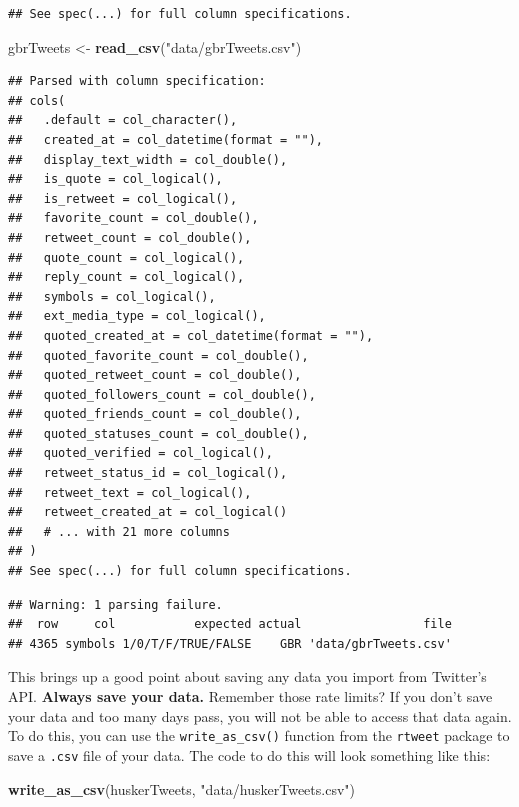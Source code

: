 \documentclass[]{book}
\newenvironment{Shaded}{\begin{snugshade}}{\end{snugshade}}
\newcommand{\KeywordTok}[1]{\textcolor[rgb]{0.13,0.29,0.53}{\textbf{#1}}}
\newcommand{\NormalTok}[1]{#1}
\newcommand{\StringTok}[1]{\textcolor[rgb]{0.31,0.60,0.02}{#1}}
\begin{document}
\begin{verbatim}
## See spec(...) for full column specifications.
\end{verbatim}

\begin{Shaded}
\begin{Highlighting}[]
\NormalTok{gbrTweets <-}\StringTok{ }\KeywordTok{read_csv}\NormalTok{(}\StringTok{"data/gbrTweets.csv"}\NormalTok{)}
\end{Highlighting}
\end{Shaded}

\begin{verbatim}
## Parsed with column specification:
## cols(
##   .default = col_character(),
##   created_at = col_datetime(format = ""),
##   display_text_width = col_double(),
##   is_quote = col_logical(),
##   is_retweet = col_logical(),
##   favorite_count = col_double(),
##   retweet_count = col_double(),
##   quote_count = col_logical(),
##   reply_count = col_logical(),
##   symbols = col_logical(),
##   ext_media_type = col_logical(),
##   quoted_created_at = col_datetime(format = ""),
##   quoted_favorite_count = col_double(),
##   quoted_retweet_count = col_double(),
##   quoted_followers_count = col_double(),
##   quoted_friends_count = col_double(),
##   quoted_statuses_count = col_double(),
##   quoted_verified = col_logical(),
##   retweet_status_id = col_logical(),
##   retweet_text = col_logical(),
##   retweet_created_at = col_logical()
##   # ... with 21 more columns
## )
## See spec(...) for full column specifications.
\end{verbatim}

\begin{verbatim}
## Warning: 1 parsing failure.
##  row     col           expected actual                 file
## 4365 symbols 1/0/T/F/TRUE/FALSE    GBR 'data/gbrTweets.csv'
\end{verbatim}

This brings up a good point about saving any data you import from Twitter's API. \textbf{Always save your data.} Remember those rate limits? If you don't save your data and too many days pass, you will not be able to access that data again. To do this, you can use the \texttt{write\_as\_csv()} function from the \texttt{rtweet} package to save a \texttt{.csv} file of your data. The code to do this will look something like this:

\begin{Shaded}
\begin{Highlighting}[]
\KeywordTok{write_as_csv}\NormalTok{(huskerTweets, }\StringTok{"data/huskerTweets.csv"}\NormalTok{)}
\end{Highlighting}
\end{Shaded}
\end{document}
